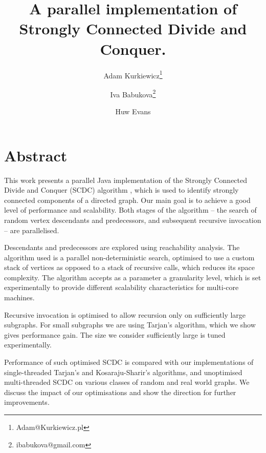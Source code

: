 \documentclass{article}
\title{A parallel implementation of Strongly Connected Divide and Conquer.}
\author[1]{Adam Kurkiewicz\thanks{Adam@Kurkiewicz.pl}}
\author[1]{Iva Babukova\thanks{ibabukova@gmail.com}}
\author[2]{Huw Evans}
\affil[1]{School of Mathematics \& Statistics, School of Computing Science, The University of Glasgow}
\affil[2]{SAS Institute Inc}
\date{}
\begin{document}
\maketitle

\section{Abstract}

\par
This work presents a parallel Java implementation of the Strongly Connected Divide and Conquer (SCDC) algorithm \cite{fleischer00}, which is used to identify strongly connected components of a directed graph. Our main goal is to achieve a good level of performance and scalability. Both stages of the algorithm -- the search of random vertex descendants and predecessors, and subsequent recursive invocation -- are parallelised.

\par
Descendants and predecessors are explored using reachability analysis. The algorithm used is a parallel non-deterministic search, optimised to use a custom stack of vertices as opposed to a stack of recursive calls, which reduces its space complexity. The algorithm accepts as a parameter a granularity level, which is set experimentally to provide different scalability characteristics for multi-core machines.

\par
Recursive invocation is optimised to allow recursion only on sufficiently large subgraphs. For small subgraphs we are using Tarjan's \cite{tarjan72} algorithm, which we show gives performance gain. The size we consider sufficiently large is tuned experimentally.

\par
Performance of such optimised SCDC is compared with our implementations of single-threaded Tarjan's \cite{tarjan72} and Kosaraju-Sharir's \cite{sharir81} algorithms, and unoptimised multi-threaded SCDC \cite{fleischer00} on various classes of random and real world graphs. We discuss the impact of our optimisations and show the direction for further improvements.
\printbibliography
\end{document}
